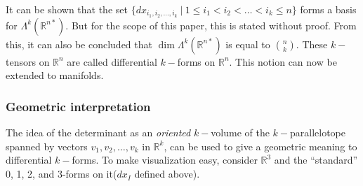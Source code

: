 \documentclass{article}
\begin{document}
\noindent It can be shown that the set $\{dx_{i_1, i_2, \ldots, i_k} \ | \ 1 \leq i_1 < i_2 < \ldots < i_k \leq n\}$ forms a basis for $\Lambda^k(\mathbb{R}^{n*})$. But for the scope of this paper, this is stated without proof. From this, it can also be concluded that $\dim \Lambda^k(\mathbb{R}^{n*}) $ is equal to $ \binom{n}{k}$. These  $k-$tensors on $\mathbb{R}^n$ are called differential  $k-$forms on $\mathbb{R}^n$. This notion can now be extended to manifolds.

\subsubsection{Geometric interpretation}
The idea of the determinant as an \emph{oriented}  $k-$volume of the  $k-$parallelotope spanned by vectors $v_1, v_2, \ldots, v_k$ in $\mathbb{R}^k$, can be used to give a geometric meaning to differential  $k-$forms. To make visualization easy, consider $\mathbb{R}^3$ and the “standard” 0, 1, 2, and 3-forms on it($dx_I$ defined above).
\end{document}

